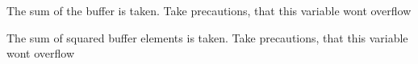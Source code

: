 
\begin{DoxyRefList}
\item[\label{bug__bug000001}%
\hypertarget{bug__bug000001}{}%
Global \hyperlink{k_buffer_8h_a1389f5c08210e077301c35bc3b43f681}{buffer\+Mean} (\hyperlink{structbuffer__t}{buffer\+\_\+t} $\ast$buffer, buffer\+Datatype $\ast$mean\+Out)]The sum of the buffer is taken. Take precautions, that this variable won\textquotesingle{}t overflow  
\item[\label{bug__bug000002}%
\hypertarget{bug__bug000002}{}%
Global \hyperlink{k_buffer_8h_a1da694b34c0a52809c923d2d149d1348}{buffer\+Mean\+R\+MS} (\hyperlink{structbuffer__t}{buffer\+\_\+t} $\ast$buffer, buffer\+Datatype $\ast$mean\+Out)]The sum of squared buffer elements is taken. Take precautions, that this variable won\textquotesingle{}t overflow 
\end{DoxyRefList}